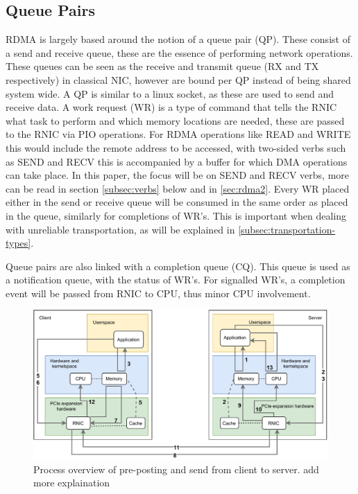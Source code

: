 \subsection{Queue Pairs}\label{subsec:queue-pairs}
RDMA is largely based around the notion of a queue pair (QP).
These consist of a send and receive queue, these are the essence of performing network operations.
These queues can be seen as the receive and transmit queue (RX and TX respectively) in classical NIC, however are bound per QP instead of being shared system wide.
A QP is similar to a linux socket, as these are used to send and receive data.
A work request (WR) is a type of command that tells the RNIC what task to perform and which memory locations are needed, these are passed to the RNIC via PIO operations.
For RDMA operations like READ and WRITE this would include the remote address to be accessed, with two-sided verbs such as SEND and RECV this is accompanied by a buffer for which DMA operations can take place.
In this paper, the focus will be on SEND and RECV verbs, more can be read in section \ref{subsec:verbs} below and in \ref{sec:rdma2}.
Every WR placed either in the send or receive queue will be consumed in the same order as placed in the queue, similarly for completions of WR's.
This is important when dealing with unreliable transportation, as will be explained in \ref{subsec:transportation-types}.

Queue pairs are also linked with a completion queue (CQ).
This queue is used as a notification queue, with the status of WR's.
For signalled WR's, a completion event will be passed from RNIC to CPU, thus minor CPU involvement.

\begin{figure}
    \centering
    \includegraphics[width=\columnwidth]{figures/PDF/RDAM_SEND_RECV_drawing}
    \caption[Process overview of pre-posting and send from client to server.]{Process overview of pre-posting and send from client to server. add more explaination}
    \label{fig:send_recv_drawing}
\end{figure}


